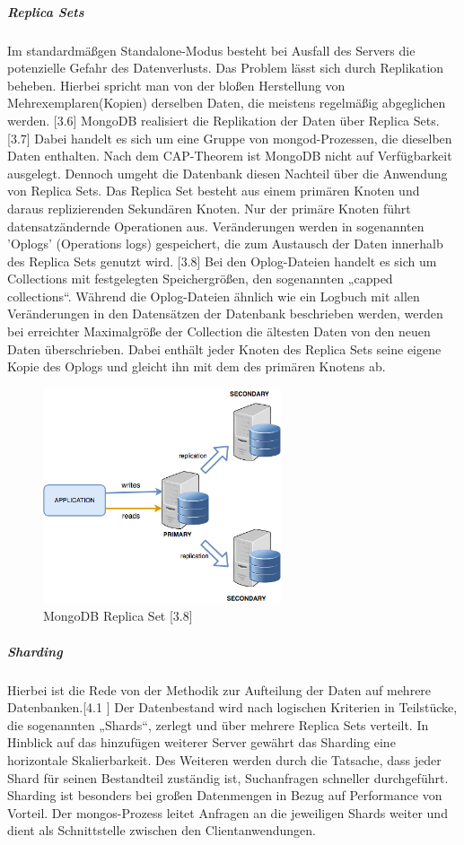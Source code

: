\subparagraph{Replica Sets}
Im standardmäßgen Standalone-Modus besteht bei Ausfall des Servers die potenzielle Gefahr des Datenverlusts. Das Problem lässt sich durch Replikation beheben. Hierbei spricht man von der bloßen Herstellung von Mehrexemplaren(Kopien) derselben Daten, die meistens regelmäßig abgeglichen werden. [3.6] MongoDB realisiert die Replikation der Daten über Replica Sets. [3.7] Dabei handelt es sich um eine Gruppe von mongod-Prozessen, die dieselben Daten enthalten. Nach dem CAP-Theorem ist MongoDB nicht auf Verfügbarkeit ausgelegt. Dennoch umgeht die Datenbank diesen Nachteil über die Anwendung von Replica Sets. Das Replica Set besteht aus einem primären Knoten und daraus replizierenden Sekundären Knoten. 
Nur der primäre Knoten führt datensatzändernde Operationen aus. Veränderungen werden in sogenannten 'Oplogs' (Operations logs) gespeichert, die zum Austausch der Daten innerhalb des Replica Sets genutzt wird. [3.8]  Bei den Oplog-Dateien handelt es sich um Collections mit festgelegten Speichergrößen, den sogenannten „capped collections“. Während die Oplog-Dateien ähnlich wie ein Logbuch mit allen Veränderungen in den Datensätzen der Datenbank beschrieben werden, werden bei erreichter Maximalgröße der Collection die ältesten Daten von den neuen Daten überschrieben. Dabei enthält jeder Knoten des Replica Sets seine eigene Kopie des Oplogs und gleicht ihn mit dem des primären Knotens ab.

\begin{figure}[htb]
\centering
\includegraphics[width=7cm]{images/replicaset1.png}
\caption{MongoDB Replica Set [3.8]}
\end{figure}



\subparagraph{Sharding}
Hierbei ist die Rede von der Methodik zur Aufteilung der Daten auf mehrere Datenbanken.[4.1 ]
Der Datenbestand wird nach logischen Kriterien in  Teilstücke, die sogenannten „Shards“, zerlegt und über mehrere Replica Sets verteilt.
In Hinblick auf das hinzufügen weiterer Server gewährt das Sharding eine horizontale Skalierbarkeit.
Des Weiteren werden durch die Tatsache, dass jeder Shard für seinen Bestandteil zuständig ist,  Suchanfragen schneller durchgeführt. 
Sharding ist besonders bei großen Datenmengen in Bezug auf Performance von Vorteil.
Der mongos-Prozess leitet Anfragen an die jeweiligen Shards weiter und dient als Schnittstelle zwischen den Clientanwendungen.

